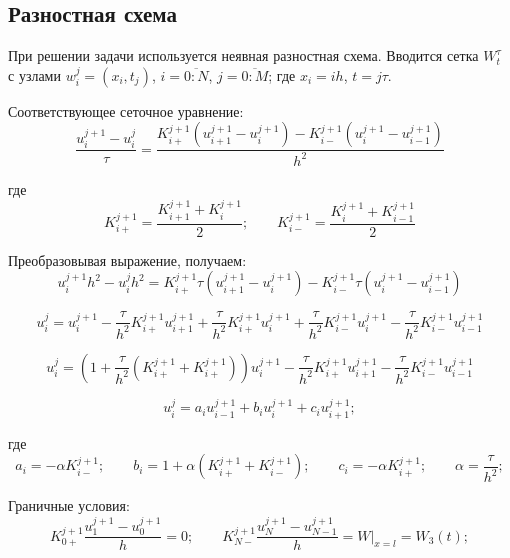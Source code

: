 \documentclass[a4paper,12pt]{article}
\begin{document}
\subsection{Разностная схема}

При решении задачи используется неявная разностная схема.
Вводится сетка $W_t^\tau$ с узлами \(w_i^j = (x_i, t_j)\), \(i = \overline{0:N}\), \(j = \overline{0:M}\); где \(x_i = ih\), \(t = j\tau\).

Соответствующее сеточное уравнение:
\begin{equation}
\frac{u_i^{j+1} - u_i^j}{\tau} = \frac{K_{i+}^{j+1}(u_{i+1}^{j+1} - u_i^{j+1}) - K_{i-}^{j+1}(u_i^{j+1} - u_{i-1}^{j+1})}{h^2}
\end{equation}

где
\begin{equation}
K_{i+}^{j+1} = \frac{K_{i+1}^{j+1} + K_i^{j+1}}{2};   \qquad
K_{i-}^{j+1} = \frac{K_i^{j+1} + K_{i-1}^{j+1}}{2} 
\end{equation}

Преобразовывая выражение, получаем:
\begin{equation}
u_i^{j+1}h^2 - u_i^jh^2 = K_{i+}^{j+1} \tau (u_{i+1}^{j+1} - u_i^{j+1}) - K_{i-}^{j+1} \tau (u_i^{j+1} - u_{i-1}^{j+1})
\end{equation}

\begin{equation}
u_i^j = u_i^{j+1} - \frac{\tau}{h^2}K_{i+}^{j+1}u_{i+1}^{j+1} + \frac{\tau}{h^2}K_{i+}^{j+1}u_i^{j+1} + \frac{\tau}{h^2}K_{i-}^{j+1}u_i^{j+1} - \frac{\tau}{h^2}K_{i-}^{j+1}u_{i-1}^{j+1}
\end{equation}

\begin{equation}
u_i^j = ( 1 + \frac{\tau}{h^2}(K_{i+}^{j+1}+K_{i+}^{j+1}))u_{i}^{j+1} - \frac{\tau}{h^2}K_{i+}^{j+1}u_{i+1}^{j+1} - \frac{\tau}{h^2}K_{i-}^{j+1}u_{i-1}^{j+1}
\end{equation}

\begin{equation}
u_i^j = a_iu_{i-1}^{j+1} + b_iu_i^{j+1} +c_iu_{i+1}^{j+1}; 
\end{equation}

где
\begin{displaymath}
a_i = -\alpha{K_{i-}^{j+1}};   \qquad
b_i = 1 + \alpha{(K_{i+}^{j+1} + K_{i-}^{j+1})};   \qquad
c_i = - \alpha{K_{i+}^{j+1}};   \qquad
\alpha = \frac{\tau}{h^2};
\end{displaymath}

Граничные условия:
\begin{equation}
K_{0+}^{j+1}\frac{u_1^{j+1} - u_0^{j+1}}{h} = 0;  \qquad
K_{N-}^{j+1}\frac{u_N^{j+1} - u_{N-1}^{j+1}}{h} = W|_{x=l} = W_3(t);
\end{equation}
\end{document}
